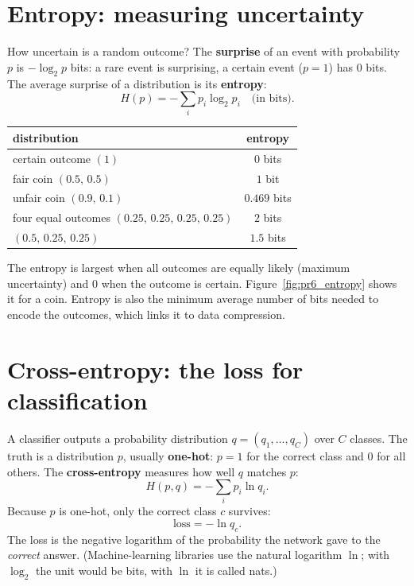 \section*{Entropy: measuring uncertainty}
How uncertain is a random outcome? The \textbf{surprise} of an event with probability $p$ is $-\log_2p$ bits: a rare event is surprising, a certain event ($p=1$) has $0$ bits. The average surprise of a distribution is its \textbf{entropy}:
\[
H(p)=-\sum_i p_i\log_2p_i\quad\text{(in bits)}.
\]
\begin{center}
\renewcommand{\arraystretch}{1.2}
\begin{tabular}{lc}
distribution & entropy\\ \hline
certain outcome $(1)$ & $0$ bits\\
fair coin $(0.5,\,0.5)$ & $1$ bit\\
unfair coin $(0.9,\,0.1)$ & $0.469$ bits\\
four equal outcomes $(0.25,\,0.25,\,0.25,\,0.25)$ & $2$ bits\\
$(0.5,\,0.25,\,0.25)$ & $1.5$ bits\\
\end{tabular}
\end{center}
The entropy is largest when all outcomes are equally likely (maximum uncertainty) and $0$ when the outcome is certain. Figure~\ref{fig:pr6_entropy} shows it for a coin. Entropy is also the minimum average number of bits needed to encode the outcomes, which links it to data compression.

\begin{center}
\label{fig:pr6_entropy}
\end{center}

\section*{Cross-entropy: the loss for classification}
A classifier outputs a probability distribution $q=(q_1,\dots,q_C)$ over $C$ classes. The truth is a distribution $p$, usually \textbf{one-hot}: $p=1$ for the correct class and $0$ for all others. The \textbf{cross-entropy} measures how well $q$ matches $p$:
\[
H(p,q)=-\sum_ip_i\ln q_i.
\]
Because $p$ is one-hot, only the correct class $c$ survives:
\[
\text{loss}=-\ln q_c.
\]
The loss is the negative logarithm of the probability the network gave to the \emph{correct} answer. (Machine-learning libraries use the natural logarithm $\ln$; with $\log_2$ the unit would be bits, with $\ln$ it is called nats.)

